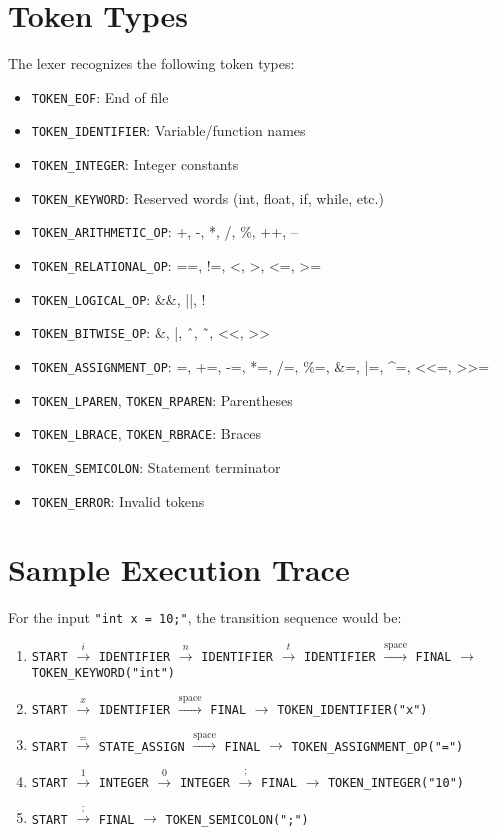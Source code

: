\documentclass[12pt,a4paper]{article}
\begin{document}
\section{Token Types}
The lexer recognizes the following token types:
\begin{itemize}
    \item \texttt{TOKEN\_EOF}: End of file
    \item \texttt{TOKEN\_IDENTIFIER}: Variable/function names
    \item \texttt{TOKEN\_INTEGER}: Integer constants
    \item \texttt{TOKEN\_KEYWORD}: Reserved words (int, float, if, while, etc.)
    \item \texttt{TOKEN\_ARITHMETIC\_OP}: +, -, *, /, \%, ++, --
    \item \texttt{TOKEN\_RELATIONAL\_OP}: ==, !=, <, >, <=, >=
    \item \texttt{TOKEN\_LOGICAL\_OP}: \&\&, ||, !
    \item \texttt{TOKEN\_BITWISE\_OP}: \&, |, \^{\ }, \~{\ }, <<, >>
    \item \texttt{TOKEN\_ASSIGNMENT\_OP}: =, +=, -=, *=, /=, \%=, \&=, |=, \^{}=, <<=, >>=
    \item \texttt{TOKEN\_LPAREN}, \texttt{TOKEN\_RPAREN}: Parentheses
    \item \texttt{TOKEN\_LBRACE}, \texttt{TOKEN\_RBRACE}: Braces
    \item \texttt{TOKEN\_SEMICOLON}: Statement terminator
    \item \texttt{TOKEN\_ERROR}: Invalid tokens
\end{itemize}

\section{Sample Execution Trace}
For the input \texttt{"int x = 10;"}, the transition sequence would be:

\begin{enumerate}
    \item \texttt{START} $\xrightarrow{i}$ \texttt{IDENTIFIER} $\xrightarrow{n}$ \texttt{IDENTIFIER} $\xrightarrow{t}$ \texttt{IDENTIFIER} $\xrightarrow{\text{space}}$ \texttt{FINAL} $\rightarrow$ \texttt{TOKEN\_KEYWORD("int")}
    \item \texttt{START} $\xrightarrow{x}$ \texttt{IDENTIFIER} $\xrightarrow{\text{space}}$ \texttt{FINAL} $\rightarrow$ \texttt{TOKEN\_IDENTIFIER("x")}
    \item \texttt{START} $\xrightarrow{=}$ \texttt{STATE\_ASSIGN} $\xrightarrow{\text{space}}$ \texttt{FINAL} $\rightarrow$ \texttt{TOKEN\_ASSIGNMENT\_OP("=")}
    \item \texttt{START} $\xrightarrow{1}$ \texttt{INTEGER} $\xrightarrow{0}$ \texttt{INTEGER} $\xrightarrow{;}$ \texttt{FINAL} $\rightarrow$ \texttt{TOKEN\_INTEGER("10")}
    \item \texttt{START} $\xrightarrow{;}$ \texttt{FINAL} $\rightarrow$ \texttt{TOKEN\_SEMICOLON(";")}
\end{enumerate}
\end{document}
